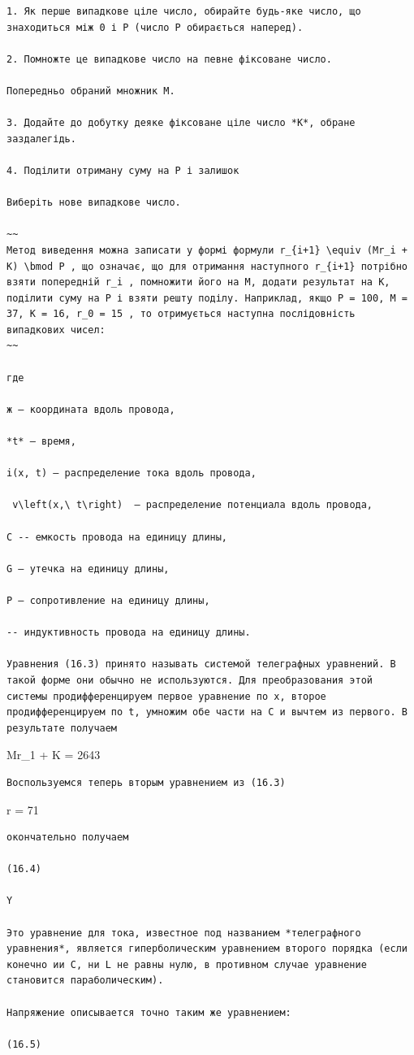 \documentclass[
  ukrainian,
]{article}
\begin{document}
\begin{verbatim}
1. Як перше випадкове ціле число, обирайте будь-яке число, що знаходиться між 0 і P (число P обирається наперед).

2. Помножте це випадкове число на певне фіксоване число.

Попередньо обраний множник M.

3. Додайте до добутку деяке фіксоване ціле число *K*, обране заздалегідь.

4. Поділити отриману суму на P і залишок

Виберіть нове випадкове число.

~~
Метод виведення можна записати у формі формули r_{i+1} \equiv (Mr_i + K) \bmod P , що означає, що для отримання наступного r_{i+1} потрібно взяти попередній r_i , помножити його на M, додати результат на K, поділити суму на P і взяти решту поділу. Наприклад, якщо P = 100, M = 37, K = 16, r_0 = 15 , то отримується наступна послідовність випадкових чисел:
~~

где

ж — координата вдоль провода,

*t* — время,

i(x, t) — распределение тока вдоль провода,

 v\left(x,\ t\right)  — распределение потенциала вдоль провода,

С -- емкость провода на единицу длины,

G — утечка на единицу длины,

Р — сопротивление на единицу длины,

-- индуктивность провода на единицу длины.

Уравнения (16.3) принято называть системой телеграфных уравнений. В такой форме они обычно не используются. Для преобразования этой системы продифференцируем первое уравнение по x, второе продифференцируем по t, умножим обе части на C и вычтем из первого. В результате получаем
\end{verbatim}

Mr\_1 + K = 2643

\begin{verbatim}
Воспользуемся теперь вторым уравнением из (16.3)
\end{verbatim}

r = 71

\begin{verbatim}
окончательно получаем

(16.4)

Y

Это уравнение для тока, известное под названием *телеграфного уравнения*, является гиперболическим уравнением второго порядка (если конечно ии C, ни L не равны нулю, в противном случае уравнение становится параболическим).

Напряжение описывается точно таким же уравнением:

(16.5)
\end{verbatim}
\end{document}
